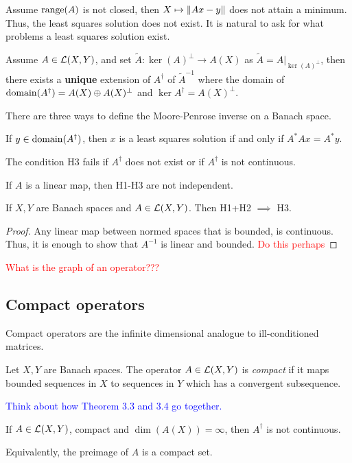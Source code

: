 \documentclass[12pt]{article}
\begin{document}
Assume $\operatorname{range}(A)$ is not closed, then $X\mapsto \left\lVert Ax-y\right\rVert$ does not attain a minimum. Thus, the least squares solution does not exist.  It is natural to ask for what problems a least squares solution exist.

\begin{theorem}
    Assume $A\in \mathcal{L}(X,Y)$, and set $\tilde{A}:\ker(A)^\perp \to A(X)$ as $\tilde{A}=A\Big|_{\ker(A)^\perp}$, then there exists a \textbf{unique} extension of $A^\dagger $ of $\tilde{A}^{-1}$ where the domain of $\operatorname{domain}(A^\dagger )=A(X)\oplus A(X)^\perp$ and $\ker A^\dagger  = A(X)^\perp$.
\end{theorem}

There are three ways to define the Moore-Penrose inverse on a Banach space.

\begin{theorem}
    If $y\in\operatorname{domain}(A^\dagger )$, then $x$ is a least squares solution if and only if $A^*Ax=A^*y$.
\end{theorem}

The condition H3 fails if $A^\dagger $ does not exist or if $A^\dagger $ is not continuous.

If $A$ is a linear map, then H1-H3 are not independent. 
\begin{theorem}
    If $X,Y$ are Banach spaces and $A\in\mathcal{L}(X,Y)$. Then H1+H2 $\implies$ H3.
\end{theorem}
\begin{proof}
    Any linear map between normed spaces that is bounded, is continuous. Thus, it is enough to show that $A^{-1}$ is linear and bounded. \textcolor{red}{Do this perhaps}
\end{proof}
\textcolor{red}{What is the graph of an operator???}

\subsection{Compact operators}
Compact operators are the infinite dimensional analogue to ill-conditioned matrices.

\begin{definition}
    Let $X,Y$ are Banach spaces. The operator $A\in\mathcal{L}(X,Y)$ is \textit{compact} if it maps bounded sequences in $X$ to sequences in $Y$ which has a convergent subsequence.
\end{definition}

\textcolor{blue}{Think about how Theorem 3.3 and 3.4 go together.}

\begin{theorem}
    If $A\in \mathcal{L}(X,Y)$, compact and $\dim(A(X))=\infty$, then $A^\dagger $ is not continuous.
\end{theorem}
\begin{remark}
    Equivalently, the preimage of $A$ is a compact set.
\end{remark}
\end{document}
